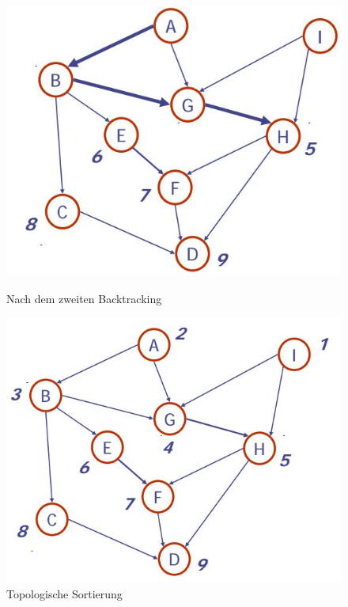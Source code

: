 \begin{figure}[ht!]
	\begin{minipage}[t]{0.4\textwidth}
			\centering
		\includegraphics[width=\linewidth]{images/dag_topological_sort_3}
		\caption{Nach dem zweiten Backtracking}
		\label{fig:dagtopologicalsort3}
	\end{minipage}
	\begin{minipage}[t]{0.4\textwidth}
		\centering
		\includegraphics[width=\linewidth]{images/dag_topological_sort_4}
		\caption{Topologische Sortierung}
		\label{fig:dagtopologicalsort4}
\end{minipage}
\end{figure}



